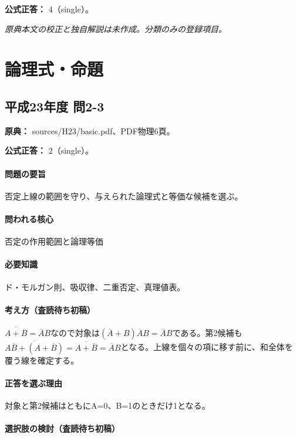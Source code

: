 \textbf{公式正答：} 4（single）。

\par\textit{原典本文の校正と独自解説は未作成。分類のみの登録項目。}

\section{論理式・命題}

\subsection{平成23年度 問2-3}
\label{q:h23-reg-basic-2-3}

\noindent\textbf{原典：} sources/H23/basic.pdf、PDF物理6頁。

\textbf{公式正答：} 2（single）。

\paragraph{問題の要旨} 否定上線の範囲を守り、与えられた論理式と等価な候補を選ぶ。

\paragraph{問われる核心} 否定の作用範囲と論理等価

\paragraph{必要知識} ド・モルガン則、吸収律、二重否定、真理値表。

\paragraph{考え方（査読待ち初稿）} \(\overline{A+\overline B}=\overline A B\)なので対象は\((\overline A+B)\overline A B=\overline A B\)である。第2候補も\(\overline{A\overline B+(A+\overline B)}=\overline{A+\overline B}=\overline A B\)となる。上線を個々の項に移す前に、和全体を覆う線を確定する。

\paragraph{正答を選ぶ理由} 対象と第2候補はともにA=\allowbreak{}0、B=\allowbreak{}1のときだけ1となる。

\paragraph{選択肢の検討（査読待ち初稿）}\mbox{}\par


